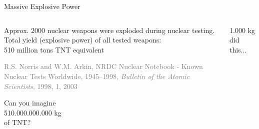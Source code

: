 \documentclass[presentation]{beamer}
\begin{document}
\begin{frame}[label=sec-1-6]{Massive Explosive Power}
\begin{columns}
\begin{column}{0.58\textwidth}
\vspace{-0.5cm}
\begin{center}
Approx. 2000 nuclear weapons were exploded during nuclear testing.\\[1em]

Total yield (explosive power) of all tested weapons: \\
510 million tons TNT equivalent

\fontsize{3pt}{3.6}\selectfont \textcolor{gray}{R.S. Norris and W.M. Arkin, NRDC Nuclear Notebook - Known Nuclear Tests Worldwide, 1945--1998, \emph{Bulletin of the Atomic Scientists}, 1998, 1, 2003}\\[1em]

\normalsize

\pause
Can you imagine\\ 510.000.000.000 kg \\ of TNT?\\[1em]

\pause

\end{center}
\end{column}

\begin{column}{0.38\textwidth}

\vspace{-0.8cm}

\begin{center}
1.000 kg did this...
\end{center}

\vspace{-0.85cm}


\end{column}
\end{columns}
\end{frame}
\end{document}
